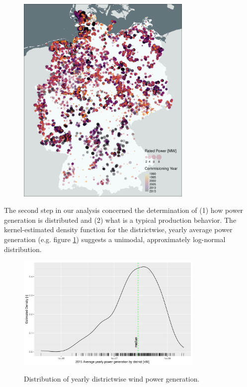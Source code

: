 \begin{figure}[H]
{        \includegraphics[width=0.75\textwidth]{map_turbines_locations_20200701_230854_fav}
    }
\end{figure}

The second step in our analysis concerned the determination of (1) how power generation is distributed and (2) what is a typical production behavior.
The kernel-estimated density function for the districtwise, yearly average power generation (e.g. figure \ref{fig:yearly_power_generation}) suggests a unimodal, approximately log-normal distribution.

\begin{figure}[H]%
	\centering
    \caption{Distribution of yearly districtwise wind power generation.}
    \includegraphics[width=0.8\textwidth]{power-generated-yearly-distribution}
	\label{fig:yearly_power_generation}
\end{figure}

